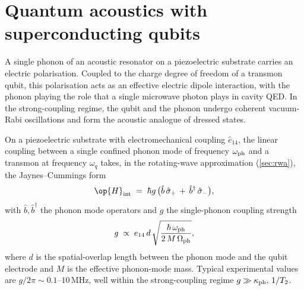 \section{Quantum acoustics with superconducting qubits}
\label{sec:quantum-acoustics}

\begin{phenomenon}
A single phonon of an acoustic resonator on a piezoelectric
substrate carries an electric polarisation. Coupled to the charge
degree of freedom of a transmon qubit, this polarisation acts as
an effective electric dipole interaction, with the phonon playing
the role that a single microwave photon plays in cavity QED. In
the strong-coupling regime, the qubit and the phonon undergo
coherent vacuum-Rabi oscillations and form the acoustic analogue
of dressed states.
\end{phenomenon}

\begin{statement}
\label{stmt:phonon-qubit-jc}
On a piezoelectric substrate with electromechanical coupling
$\hat e_{14}$, the linear coupling between a single confined
phonon mode of frequency $\omega_{\rm ph}$ and a transmon at
frequency $\omega_q$ takes, in the rotating-wave approximation
(\cref{sec:rwa}), the Jaynes--Cummings form
\begin{equation}
\label{eq:phonon-qubit-jc}
\op{H}_{\rm int} \;=\; \hbar g\,
\bigl(\hat b\,\hat\sigma_+ \,+\, \hat b^\dagger\,\hat\sigma_-\bigr),
\end{equation}
with $\hat b,\hat b^\dagger$ the phonon mode operators and
$g$ the single-phonon coupling strength
\begin{equation}
\label{eq:phonon-coupling}
g \;\propto\; e_{14}\,d\,\sqrt{\frac{\hbar\,\omega_{\rm ph}}{2\,M\,\Omega_{\rm ph}}},
\end{equation}
where $d$ is the spatial-overlap length between the phonon mode
and the qubit electrode and $M$ is the effective phonon-mode
mass. Typical experimental values are
$g/2\pi\sim 0.1\text{--}10\,\text{MHz}$, well within the
strong-coupling regime $g\gg\kappa_{\rm ph},\,1/T_2$.
\end{statement}

